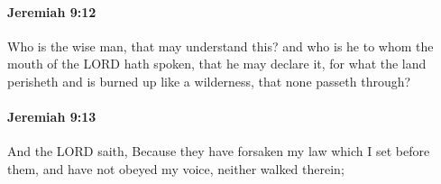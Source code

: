 		\paragraph{Jeremiah 9:12} %
			\label{JEREMIAH-9-12}

			Who is the wise man, that may understand this? and who is he to whom the mouth of the LORD hath spoken, that he may declare it, for what the land perisheth and is burned up like a wilderness, that none passeth through?


		\paragraph{Jeremiah 9:13} %
			\label{JEREMIAH-9-13}

			And the LORD saith, Because they have forsaken my law which I set before them, and have not obeyed my voice, neither walked therein;


